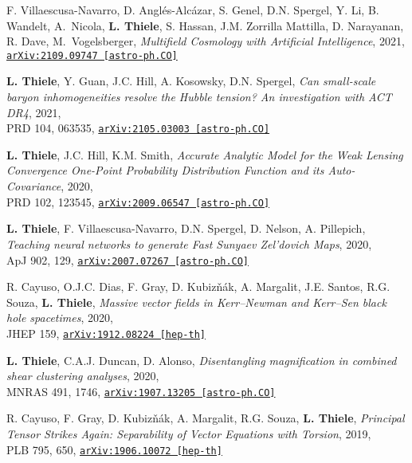 F. Villaescusa-Navarro, D. Angl\'es-Alc\'azar, S. Genel, D.N. Spergel, Y. Li,
B. Wandelt, A.~Nicola, {\bf L. Thiele}, S. Hassan, J.M. Zorrilla Mattilla,
D. Narayanan, R. Dave, M.~Vogelsberger,
\emph{Multifield Cosmology with Artificial Intelligence}, 2021,\\
\href{https://arxiv.org/abs/2109.09747}{\mbox{\texttt{arXiv:2109.09747 [astro-ph.CO]}}}

{\bf L. Thiele}, Y. Guan, J.C. Hill, A. Kosowsky, D.N. Spergel,
\emph{Can small-scale baryon inhomogeneities resolve the Hubble tension?
      An investigation with ACT DR4}, 2021,\\
PRD 104, 063535,
\href{https://arxiv.org/abs/2105.03003}{\mbox{\texttt{arXiv:2105.03003 [astro-ph.CO]}}}

\newpage
\vspace*{0.5cm}

{\bf L. Thiele}, J.C. Hill, K.M. Smith,
\emph{Accurate Analytic Model for the Weak Lensing Convergence One-Point Probability
      Distribution Function and its Auto-Covariance}, 2020,\\
PRD 102, 123545,
\href{https://arxiv.org/abs/2009.06547}{\mbox{\texttt{arXiv:2009.06547 [astro-ph.CO]}}}

{\bf L. Thiele}, F. Villaescusa-Navarro, D.N. Spergel, D. Nelson, A. Pillepich,
\emph{Teaching neural networks to generate Fast Sunyaev Zel'dovich Maps}, 2020,\\
ApJ 902, 129,
\href{https://arxiv.org/abs/2007.07267}{\mbox{\texttt{arXiv:2007.07267 [astro-ph.CO]}}}

R. Cayuso, O.J.C. Dias, F. Gray, D. Kubiz\v{n}\'{a}k, A. Margalit, J.E. Santos,
R.G. Souza, {\bf L. Thiele},
\emph{Massive vector fields in Kerr--Newman and Kerr--Sen black hole spacetimes}, 2020,\\
JHEP 159,
\href{https://arxiv.org/abs/1912.08224}{\mbox{\texttt{arXiv:1912.08224 [hep-th]}}}

{\bf L. Thiele}, C.A.J. Duncan, D. Alonso,
\emph{Disentangling magnification in combined shear clustering analyses}, 2020,\\
MNRAS 491, 1746,
\href{https://arxiv.org/abs/1907.13205}{\mbox{\texttt{arXiv:1907.13205 [astro-ph.CO]}}}

R. Cayuso, F. Gray, D. Kubiz\v{n}\'{a}k, A. Margalit, R.G. Souza, {\bf L. Thiele},
\emph{Principal Tensor Strikes Again: Separability of Vector Equations with Torsion}, 2019,\\
PLB 795, 650,
\href{https://arxiv.org/abs/1906.10072}{\mbox{\texttt{arXiv:1906.10072 [hep-th]}}}

